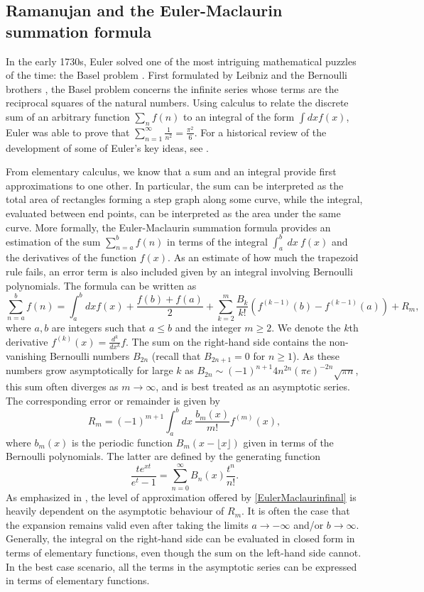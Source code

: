 \documentclass[11pt, letter]{article}
\def\be{\begin{equation}}
\def\ee{\end{equation}}
\begin{document}
\subsection{Ramanujan and the Euler-Maclaurin summation formula} \label{sec:EM}
In the early 1730s, Euler solved one of the most intriguing mathematical puzzles of the time: the Basel problem  \citep{Euler08Reciprocals}.  First formulated by Leibniz and the Bernoulli brothers \citep{Peng02a}, the Basel problem concerns the infinite series whose terms are the reciprocal squares of the natural numbers. Using calculus to relate the discrete sum of an arbitrary function $\sum_n \limits f(n)$ to an integral of the form $\int  dx  f(x)$, Euler was able to prove that $\sum_{n=1}^\infty \frac{1}{n^2}=\frac{\pi^2}{6}$. For a historical review of the development of some of Euler's key ideas, see \citep{Peng07,Ferraro98}.

From elementary calculus, we know that a sum and an integral provide first approximations to one other. In particular,  the sum can be interpreted as the total area of rectangles forming a step graph along some curve, while the integral, evaluated between end points, can  be interpreted as the area under the same curve. More formally, the Euler-Maclaurin summation formula provides an estimation of the sum $\sum \limits_{n=a}^b f(n)$ in terms of the integral $\int_a^b \ dx \ f(x)$ and the derivatives of the function $f(x)$. As an estimate of how much the trapezoid rule fails, an error term is also included given by an integral involving Bernoulli polynomials. The formula can be written as \citep{Candelpergher17}
\begin{equation}\label{EulerMaclaurinfinal}
\sum_{n=a}^b f(n) = \int^b_a dx f(x) + \frac{f(b) + f(a)}{2}+ \sum \limits_{k=2}^{m} \frac{B_{k}}{k!} (f^{(k-1)}(b)-f^{(k-1)} (a))  + R_m,
\end{equation}
where   $a,b$ are integers such that $a \leq b$ and the integer $m \geq 2$.  We denote the $k$th derivative $f^{(k)}(x)=\frac{d^k}{dx^k}f$.  The sum on the right-hand side contains the non-vanishing Bernoulli numbers $B_{2n}$ (recall that $B_{2n+1}=0$ for $n \geq 1$). As these numbers grow asymptotically for large $k$ as $B_{2n} \sim (-1)^{n+1} 4 n^{2n} (\pi e)^{-2n} \sqrt{\pi n }$, this sum often diverges as $m \to \infty$, and is best treated as an asymptotic series. The corresponding error or remainder  is given by 
\be
R_m = (-1)^{m+1} \int^b_a dx \ \frac{b_{m}(x)}{m!} f^{(m)}(x),
\ee
where $b_m(x)$ is the periodic function $B_m(x-\lfloor x \rfloor)$ given in terms of the Bernoulli polynomials. The latter are defined by the generating function
\be
\frac{te^{xt} }{e^{t}-1}=\sum_{n=0}^\infty B_n(x) \frac{t^n}{n!}. 
\ee
 As emphasized in \cite{Tao11}, the level of approximation offered by \eqref{EulerMaclaurinfinal} is heavily dependent on the asymptotic behaviour of $R_m$. It is often the case that the expansion remains valid even after taking the limits $a \rightarrow -\infty$ and/or $b \rightarrow \infty$. Generally, the integral on the right-hand side can be evaluated in closed form in terms of elementary functions, even though the sum on the left-hand side cannot. In the best case  scenario, all the terms in the asymptotic series can be expressed in terms of elementary functions. 
 
\end{document}

